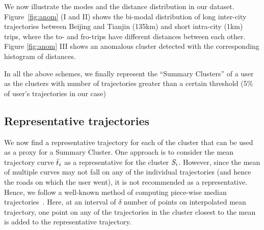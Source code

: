 We now illustrate the modes and the distance distribution in our dataset. Figure~\ref{fig:anom} (I and II) shows the bi-modal distribution of long inter-city trajectories between Beijing and Tianjin (\unit{135}{km}) and short intra-city (\unit{1}{km}) trips, where the to- and fro-trips have different distances between each other. Figure \ref{fig:anom} III shows an anomalous cluster detected with the corresponding histogram of distances.

In all the above schemes, we finally represent the ``Summary Clusters'' of a user as the clusters with number of trajectories greater than a certain threshold (5\% of user's trajectories in our case)

\subsection{Representative trajectories}
\label{sec:repTraj}
We now find a representative trajectory for each of the cluster that can be used as a proxy for a Summary Cluster. One approach is to consider the mean trajectory curve $\bar{t}_i$ as a representative for the cluster $S_i$. However, since the mean of multiple curves may not fall on any of the individual trajectories (and hence the roads on which the user went), it is not recommended as a representative. Hence, we follow a well-known method of computing piece-wise median trajectories~\cite{median1}. Here, at an interval of $\delta$ number of points on interpolated mean trajectory, one point on any of the trajectories in the cluster closest to the mean is added to the representative trajectory. 


